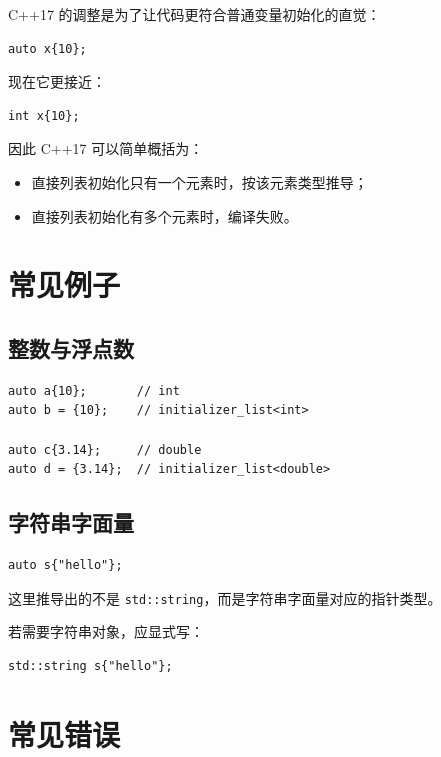 \documentclass[UTF8,12pt,a4paper]{ctexart}
\begin{document}
C++17 的调整是为了让代码更符合普通变量初始化的直觉：

\begin{lstlisting}
auto x{10};
\end{lstlisting}

现在它更接近：

\begin{lstlisting}
int x{10};
\end{lstlisting}

因此 C++17 可以简单概括为：

\begin{itemize}
    \item 直接列表初始化只有一个元素时，按该元素类型推导；
    \item 直接列表初始化有多个元素时，编译失败。
\end{itemize}

\section{常见例子}

\subsection{整数与浮点数}

\begin{lstlisting}
auto a{10};       // int
auto b = {10};    // initializer_list<int>

auto c{3.14};     // double
auto d = {3.14};  // initializer_list<double>
\end{lstlisting}

\subsection{字符串字面量}

\begin{lstlisting}
auto s{"hello"};
\end{lstlisting}

这里推导出的不是 \texttt{std::string}，而是字符串字面量对应的指针类型。

若需要字符串对象，应显式写：

\begin{lstlisting}
std::string s{"hello"};
\end{lstlisting}

\section{常见错误}
\end{document}
